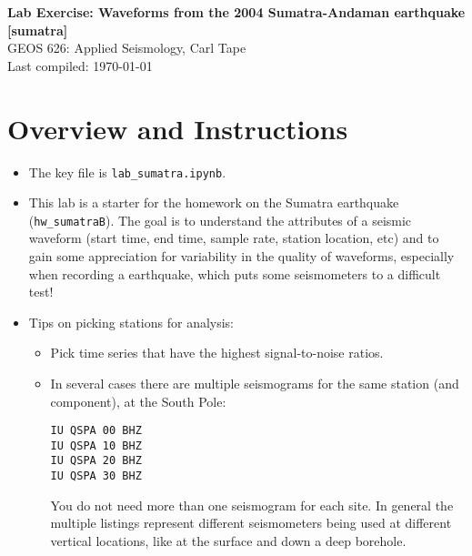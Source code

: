 \documentclass[11pt,titlepage,fleqn]{article}
\newcommand{\tfile}{{\tt lab\_sumatra.ipynb}}
\begin{document}

\begin{spacing}{1.2} 
\centering
{\large \bf Lab Exercise: Waveforms from the 2004 Sumatra-Andaman earthquake [sumatra]} \\
GEOS 626: Applied Seismology, Carl Tape \\
Last compiled: \today
\end{spacing}

\section{Overview and Instructions}

\begin{itemize}
\item The key file is \tfile.


\item This lab is a starter for the homework on the Sumatra earthquake (\verb+hw_sumatraB+). The goal is to understand the attributes of a seismic waveform (start time, end time, sample rate, station location, etc) and to gain some appreciation for variability in the quality of waveforms, especially when recording a  earthquake, which puts some seismometers to a difficult test!


\item Tips on picking stations for analysis:
\begin{itemize}
\item Pick time series that have the highest signal-to-noise ratios.
\item In several cases there are multiple seismograms for the same station (and component), \eg at the South Pole:
%
\begin{spacing}{1.0}
\begin{verbatim}
IU QSPA 00 BHZ
IU QSPA 10 BHZ
IU QSPA 20 BHZ
IU QSPA 30 BHZ
\end{verbatim}
\end{spacing}
%
You do not need more than one seismogram for each site. In general the multiple listings represent different seismometers being used at different vertical locations, like at the surface and down a deep borehole.


\end{itemize}
\end{itemize}
\end{document}
